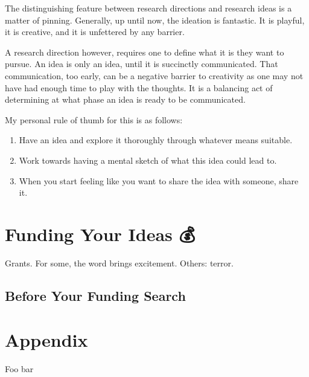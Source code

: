 \documentclass[
  notoc %
]{tufte-book}
\begin{document}
The distinguishing feature between research directions and research
ideas is a matter of pinning. Generally, up until now, the ideation is
fantastic. It is playful, it is creative, and it is unfettered by any
barrier.

A research direction however, requires one to define what it is they
want to pursue. An idea is only an idea, until it is succinctly
communicated. That communication, too early, can be a negative barrier
to creativity as one may not have had enough time to play with the
thoughts. It is a balancing act of determining at what phase an idea is
ready to be communicated.

My personal rule of thumb for this is as follows:

\begin{enumerate}
\def\labelenumi{\arabic{enumi}.}
\item
  Have an idea and explore it thoroughly through whatever means
  suitable.
\item
  Work towards having a mental sketch of what this idea could lead to.
\item
  When you start feeling like you want to share the idea with someone,
  share it.
\end{enumerate}

\hypertarget{funding-your-ideas}{%
\chapter{Funding Your Ideas 💰}\label{funding-your-ideas}}

Grants. For some, the word brings excitement. Others: terror.

\hypertarget{before-your-funding-search}{%
\section{Before Your Funding Search}\label{before-your-funding-search}}

\hypertarget{section}{%
\section{}\label{section}}

\hypertarget{appendix}{%
\chapter*{Appendix}\label{appendix}}

Foo bar
\end{document}
